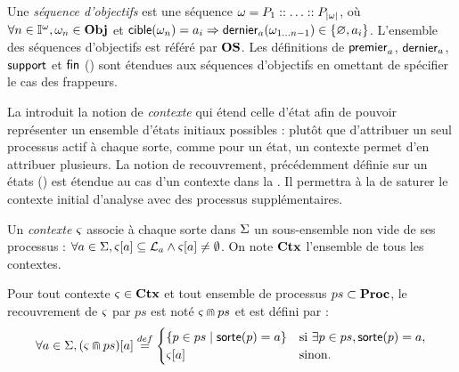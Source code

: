 \begin{definition}
  Une \emph{séquence d'objectifs} est une séquence $\omega = P_1 :: \ldots :: P_{|\omega|}$,
  où $\forall n \in \mathbb{I}^{\omega}, \omega_n \in \mathbf{Obj}$
  et $\mathsf{cible}(\omega_n) = a_i \Rightarrow \mathsf{dernier}_{a}(\omega_{1 \ldots n-1}) \in \{ \varnothing, a_i \}$.
  L'ensemble des séquences d'objectifs est référé par $\mathbf{OS}$.
  Les définitions de $\mathsf{premier}_a$, $\mathsf{dernier}_a$,  $\mathsf{support}$ et $\mathsf{fin}$
  () sont étendues aux séquences d'objectifs en omettant
  de spécifier le cas des frappeurs.
\end{definition}

La  introduit la notion de \emph{contexte} qui étend celle d'état
afin de pouvoir représenter un ensemble d'états initiaux possibles :
plutôt que d'attribuer un seul processus actif à chaque sorte, comme pour un état,
un contexte permet d'en attribuer plusieurs.
La notion de recouvrement, précédemment définie sur un états ()
est étendue au cas d'un contexte dans la .
Il permettra à la  de saturer le contexte initial d'analyse
avec des processus supplémentaires.

\begin{definition}
  Un \emph{contexte} $\varsigma$ associe à chaque sorte dans $\Sigma$ un sous-ensemble non vide
  de ses processus :
  $\forall a \in \Sigma, {\varsigma[a]} \subseteq \mathcal{L}_a \wedge {\varsigma[a]} \neq \emptyset$.
  On note $\mathbf{Ctx}$ l'ensemble de tous les contextes.
\end{definition}

\begin{definition}
  Pour tout contexte $\varsigma \in \mathbf{Ctx}$ et tout ensemble de processus $ps \subset \mathbf{Proc}$,
  le recouvrement de $\varsigma$ par $ps$ est noté $\varsigma \Cap ps$ et est défini par :
    \[ \forall a \in \Sigma, {(\varsigma \Cap ps)[a]} \stackrel{def}=
      \begin{cases}
        \{ p \in ps \mid \mathsf{sorte}(p)=a \} & \text{si } \exists p \in ps, \mathsf{sorte}(p)=a,\\
        {\varsigma[a]} & \text{sinon.}
      \end{cases} \]
\end{definition}

